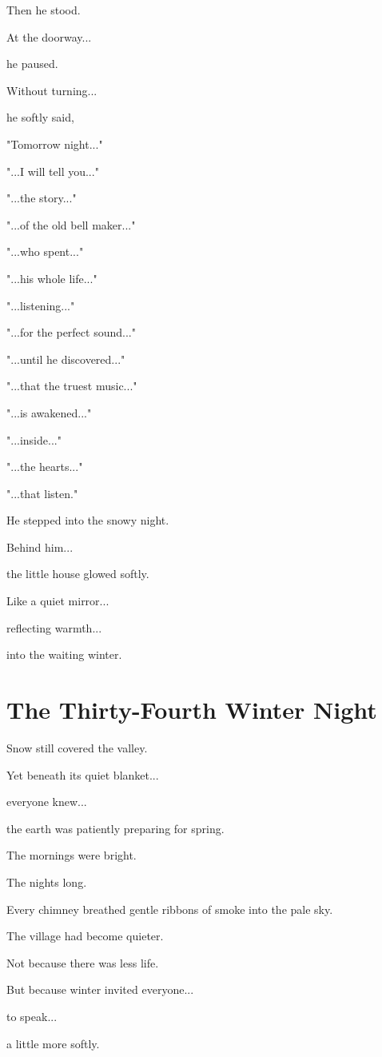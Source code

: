 \documentclass[12pt,openany]{book}
\begin{document}
Then he stood.

At the doorway...

he paused.

Without turning...

he softly said,

"Tomorrow night..."

"...I will tell you..."

"...the story..."

"...of the old bell maker..."

"...who spent..."

"...his whole life..."

"...listening..."

"...for the perfect sound..."

"...until he discovered..."

"...that the truest music..."

"...is awakened..."

"...inside..."

"...the hearts..."

"...that listen."

He stepped into the snowy night.

Behind him...

the little house glowed softly.

Like a quiet mirror...

reflecting warmth...

into the waiting winter.
\chapter{The Thirty-Fourth Winter Night}

Snow still covered the valley.

Yet beneath its quiet blanket...

everyone knew...

the earth was patiently preparing for spring.

The mornings were bright.

The nights long.

Every chimney breathed gentle ribbons of smoke into the pale sky.

The village had become quieter.

Not because there was less life.

But because winter invited everyone...

to speak...

a little more softly.
\end{document}
